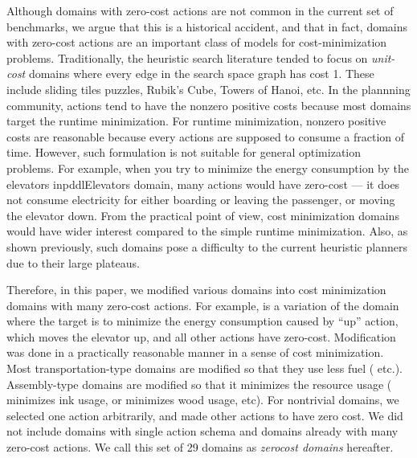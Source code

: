 Although domains with zero-cost actions are not common in the current set of benchmarks, we argue that this is a historical accident, and that in fact, domains with zero-cost actions are an important class of models for cost-minimization problems.
% 
Traditionally, the heuristic search literature tended to focus on \emph{unit-cost} domains where every edge in the search space graph has cost 1. These include sliding tiles puzzles, Rubik's Cube, Towers of Hanoi, etc.
% 
In the plannning community,
actions tend to have the nonzero positive costs
because most domains target the runtime minimization.
For runtime minimization,
nonzero positive costs are reasonable because
every actions are supposed to consume a fraction of time.
However, such formulation is not suitable for general optimization
problems.  For example, when you try to minimize the energy consumption
by the elevators inpddl{Elevators} domain, many actions would have zero-cost
--- it does not consume electricity for either boarding or leaving the
passenger, or moving the elevator down.
% 
From the practical point of
view, cost minimization domains would have wider interest compared to
the simple runtime minimization.
Also, as shown previously, such domains pose a
difficulty to the current heuristic planners due to their large plateaus.

Therefore, in this paper, we modified various domains
into cost minimization domains with many zero-cost actions.
For example,  is a variation of
the  domain where the target is to minimize
the energy consumption caused by ``up'' action, which moves the elevator
up, and all other actions have zero-cost.  Modification was done in a
practically reasonable manner in a sense of cost minimization. Most
transportation-type domains are modified so that they use less
fuel ( etc.). Assembly-type domains are modified so that it minimizes the
resource usage ( minimizes ink usage, or 
minimizes wood usage, etc). For nontrivial domains, we selected one action
arbitrarily, and made other actions to have zero cost. We did not
include domains with single action schema and domains already with many
zero-cost actions.
We call this set of 29 domains as \emph{zerocost domains} hereafter.

